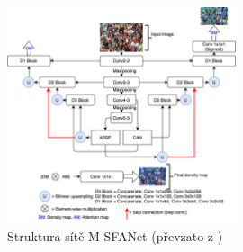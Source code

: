 \begin{description}
\begin{figure}[h!]
	\centering
	\includegraphics[width=0.6\textwidth]{Figures/history/MSFANet.png}
	\caption{Struktura sítě M-SFANet (převzato z \cite{MSFANet_for_crowd_counting})}
	\label{fig:M-SFANet}
\end{figure}

\end{description}







\endinput
